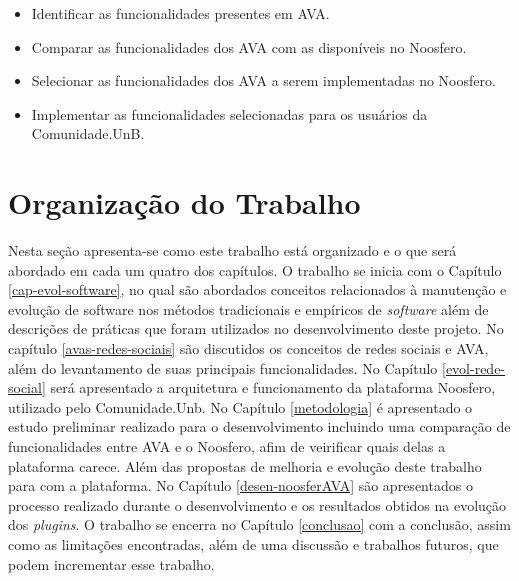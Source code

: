 \begin{itemize}
\item Identificar as funcionalidades presentes em AVA.
\item Comparar as funcionalidades dos AVA com as disponíveis no Noosfero.
\item Selecionar as funcionalidades dos AVA a serem implementadas no Noosfero.
\item Implementar as funcionalidades selecionadas para os usuários da Comunidade.UnB.
\end{itemize}

\section{Organização do Trabalho}

Nesta seção apresenta-se como este trabalho está organizado e o que será abordado em cada um quatro dos capítulos. O trabalho se inicia com o Capítulo \ref{cap-evol-software}, no qual são abordados conceitos relacionados à manutenção e evolução de software nos métodos tradicionais e empíricos de \textit{software} além de descrições de práticas que foram utilizados no desenvolvimento deste projeto. No capítulo \ref{avas-redes-sociais} são discutidos os conceitos de redes sociais e AVA, além do levantamento de suas principais funcionalidades. No Capítulo \ref{evol-rede-social} será apresentado a arquitetura e funcionamento da plataforma Noosfero, utilizado pelo Comunidade.Unb. No Capítulo \ref{metodologia} é apresentado o estudo preliminar realizado para o desenvolvimento incluindo uma comparação de funcionalidades entre AVA e o Noosfero, afim de veirificar quais delas a plataforma carece. Além das propostas de melhoria e evolução deste trabalho para com a plataforma. No Capítulo \ref{desen-noosferAVA} são apresentados o processo realizado durante o desenvolvimento e os resultados obtidos na evolução dos \textit{plugins}. O trabalho se encerra no Capítulo \ref{conclusao} com a conclusão, assim como as limitações encontradas, além de uma discussão e trabalhos futuros, que podem incrementar esse trabalho.
